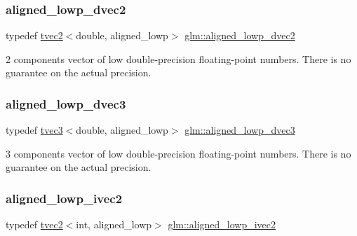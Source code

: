 \subsubsection{\texorpdfstring{aligned\+\_\+lowp\+\_\+dvec2}{aligned\_lowp\_dvec2}}
{\footnotesize\ttfamily typedef \hyperlink{structglm_1_1tvec2}{tvec2}$<$double, aligned\+\_\+lowp$>$ \hyperlink{group__gtc__type__aligned_ga34c204b5e816428a4ad5b0489fe8aa48}{glm\+::aligned\+\_\+lowp\+\_\+dvec2}}

2 components vector of low double-\/precision floating-\/point numbers. There is no guarantee on the actual precision. \mbox{\label{group__gtc__type__aligned_ga858a0e5240ebf37327c00aa040e5ed42}} 
\subsubsection{\texorpdfstring{aligned\+\_\+lowp\+\_\+dvec3}{aligned\_lowp\_dvec3}}
{\footnotesize\ttfamily typedef \hyperlink{structglm_1_1tvec3}{tvec3}$<$double, aligned\+\_\+lowp$>$ \hyperlink{group__gtc__type__aligned_ga858a0e5240ebf37327c00aa040e5ed42}{glm\+::aligned\+\_\+lowp\+\_\+dvec3}}

3 components vector of low double-\/precision floating-\/point numbers. There is no guarantee on the actual precision. \mbox{\label{group__gtc__type__aligned_gaa68001df1954981214e828384e776d8e}} 
\subsubsection{\texorpdfstring{aligned\+\_\+lowp\+\_\+ivec2}{aligned\_lowp\_ivec2}}
{\footnotesize\ttfamily typedef \hyperlink{structglm_1_1tvec2}{tvec2}$<$int, aligned\+\_\+lowp$>$ \hyperlink{group__gtc__type__aligned_gaa68001df1954981214e828384e776d8e}{glm\+::aligned\+\_\+lowp\+\_\+ivec2}}

